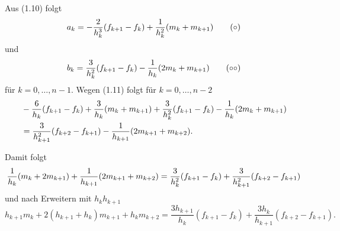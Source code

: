 Aus (1.10) folgt
\[ a_k = - \frac{2}{h_k^3} (f_{k+1} - f_k) + \frac{1}{h_k^2} (m_k + m_{k+1} ) \tag{$\circ$} \]
und
\[ b_k = \frac{3}{h_k^2} (f_{k+1} - f_k) - \frac{1}{h_k} (2 m_k + m_{k+1} ) \tag{$\circ\circ$}\]
für $k = 0, \ldots, n-1$. Wegen (1.11) folgt für $k = 0, \ldots, n-2$
\begin{align*}
 &- \frac{6}{h_k} (f_{k+1} - f_k) + \frac{3}{h_k} (m_k + m_{k+1} ) + \frac{3}{h_k^2} (f_{k+1} - f_k) - \frac{1}{h_k} (2 m_k + m_{k+1} ) \\
 &= \frac{3}{h_{k+1}^2} (f_{k+2} - f_{k+1}) - \frac{1}{h_{k+1}} (2 m_{k+1} + m_{k+2} ).
\end{align*}

Damit folgt
\[ \frac{1}{h_k} (m_k + 2 m_{k+1}) + \frac{1}{h_{k+1}} (2m_{k+1} + m_{k+2}) = \frac{3}{h_k^2} (f_{k+1} - f_k) + \frac{3}{h_{k+1}^2} (f_{k+2} - f_{k+1}) \]
und nach Erweitern mit $h_k h_{k+1}$
\[ h_{k+1} m_k + 2( h_{k+1} + h_k ) m_{k+1} + h_k m_{k+2} = \frac{3h_{k+1}}{h_k} (f_{k+1} - f_k) + \frac{3 h_k}{h_{k+1}} ( f_{k+2} - f_{k+1} ). \]

